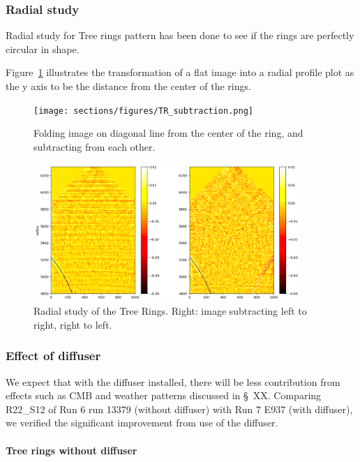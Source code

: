 \subsubsection{Radial study}
Radial study for Tree rings pattern has been done to see if the rings are perfectly circular in shape. 

Figure~\ref{fig:tree-ring-radial-transform} illustrates the transformation of a flat image into a radial profile plot as the y axis to be the distance from the center of the rings. 

\begin{figure}
\begin{centering}
\texttt{[image: sections/figures/TR\_subtraction.png]}
\end{centering}
\caption{Folding image on diagonal line from the center of the ring, and subtracting from each other.}
\label{fig:tree-ring-radial-transform}
\end{figure}

\begin{figure}
\begin{centering}
\includegraphics[width=0.9\textwidth]{sections/figures/TR_radial.png}
\end{centering}
\caption{Radial study of the Tree Rings. Right: image subtracting left to right, right to left.}
\end{figure}

\subsubsection{Effect of diffuser}
We expect that with the diffuser installed, there will be less contribution from effects such as CMB and weather patterns discussed in \S~XX. Comparing R22\_S12 of Run 6 run 13379 (without diffuser) with Run 7 E937 (with diffuser), we verified the significant improvement from use of the diffuser.
\paragraph{Tree rings without diffuser}

